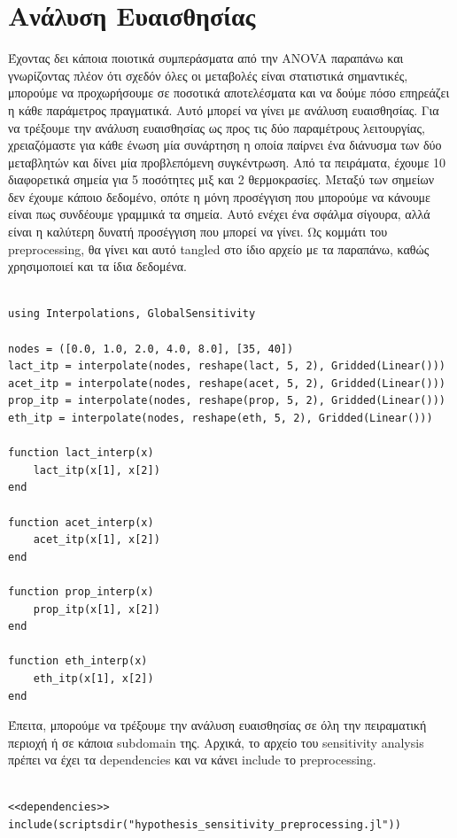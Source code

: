 \documentclass[11pt]{article}
\begin{document}
\section{Ανάλυση Ευαισθησίας}
\label{sec:org45a1836}
Έχοντας δει κάποια ποιοτικά συμπεράσματα από την ANOVA παραπάνω και γνωρίζοντας πλέον ότι σχεδόν όλες οι μεταβολές είναι στατιστικά σημαντικές, μπορούμε να προχωρήσουμε σε ποσοτικά αποτελέσματα και να δούμε πόσο επηρεάζει η κάθε παράμετρος πραγματικά. Αυτό μπορεί να γίνει με ανάλυση ευαισθησίας. Για να τρέξουμε την ανάλυση ευαισθησίας ως προς τις δύο παραμέτρους λειτουργίας, χρειαζόμαστε για κάθε ένωση μία συνάρτηση η οποία παίρνει ένα διάνυσμα των δύο μεταβλητών και δίνει μία προβλεπόμενη συγκέντρωση. Από τα πειράματα, έχουμε 10 διαφορετικά σημεία για 5 ποσότητες μιξ και 2 θερμοκρασίες. Μεταξύ των σημείων δεν έχουμε κάποιο δεδομένο, οπότε η μόνη προσέγγιση που μπορούμε να κάνουμε είναι πως συνδέουμε γραμμικά τα σημεία. Αυτό ενέχει ένα σφάλμα σίγουρα, αλλά είναι η καλύτερη δυνατή προσέγγιση που μπορεί να γίνει. Ως κομμάτι του preprocessing, θα γίνει και αυτό tangled στο ίδιο αρχείο με τα παραπάνω, καθώς χρησιμοποιεί και τα ίδια δεδομένα.

\begin{verbatim}

using Interpolations, GlobalSensitivity

nodes = ([0.0, 1.0, 2.0, 4.0, 8.0], [35, 40])
lact_itp = interpolate(nodes, reshape(lact, 5, 2), Gridded(Linear()))
acet_itp = interpolate(nodes, reshape(acet, 5, 2), Gridded(Linear()))
prop_itp = interpolate(nodes, reshape(prop, 5, 2), Gridded(Linear()))
eth_itp = interpolate(nodes, reshape(eth, 5, 2), Gridded(Linear()))

function lact_interp(x)
    lact_itp(x[1], x[2])
end

function acet_interp(x)
    acet_itp(x[1], x[2])
end

function prop_interp(x)
    prop_itp(x[1], x[2])
end

function eth_interp(x)
    eth_itp(x[1], x[2])
end

\end{verbatim}

Έπειτα, μπορούμε να τρέξουμε την ανάλυση ευαισθησίας σε όλη την πειραματική περιοχή ή σε κάποια subdomain της. Αρχικά, το αρχείο του sensitivity analysis πρέπει να έχει τα dependencies και να κάνει include το preprocessing.

\begin{verbatim}

<<dependencies>>
include(scriptsdir("hypothesis_sensitivity_preprocessing.jl"))

\end{verbatim}
\end{document}
